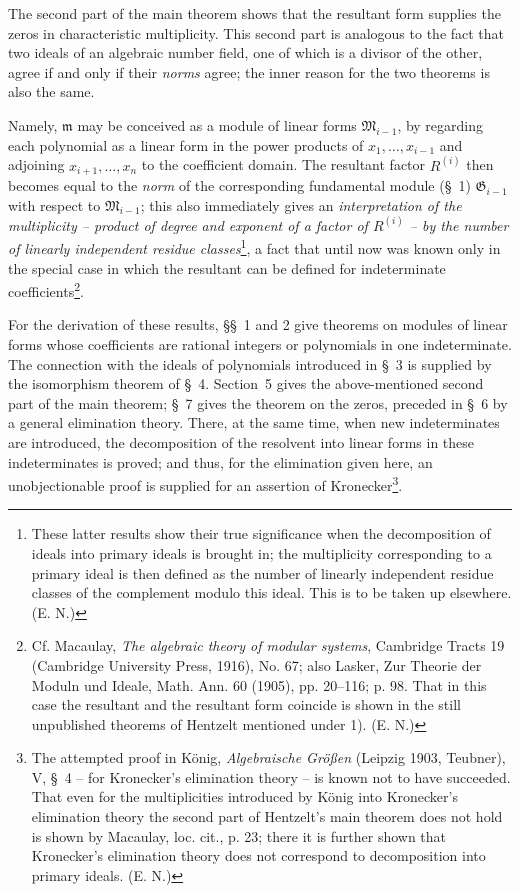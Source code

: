 \documentclass[11pt]{article}
\providecommand{\Gmod}{\mathfrak G}
\providecommand{\mideal}{\mathfrak m}
\providecommand{\Gmod}{\mathfrak G}
\providecommand{\mideal}{\mathfrak m}
\begin{document}
The second part of the main theorem shows that the resultant form supplies the zeros in characteristic multiplicity. This second part is analogous to the fact that two ideals of an algebraic number field, one of which is a divisor of the other, agree if and only if their \emph{norms} agree; the inner reason for the two theorems is also the same.

Namely, $\mideal$ may be conceived as a module of linear forms $\mathfrak M_{i-1}$, by regarding each polynomial as a linear form in the power products of $x_1,\ldots,x_{i-1}$ and adjoining $x_{i+1},\ldots,x_n$ to the coefficient domain. The resultant factor $R^{(i)}$ then becomes equal to the \emph{norm} of the corresponding fundamental module (§~1) $\Gmod_{i-1}$ with respect to $\mathfrak M_{i-1}$; this also immediately gives an \emph{interpretation of the multiplicity -- product of degree and exponent of a factor of $R^{(i)}$ -- by the number of linearly independent residue classes}\footnote{These latter results show their true significance when the decomposition of ideals into primary ideals is brought in; the multiplicity corresponding to a primary ideal is then defined as the number of linearly independent residue classes of the complement modulo this ideal. This is to be taken up elsewhere. (E. N.)}, a fact that until now was known only in the special case in which the resultant can be defined for indeterminate coefficients\footnote{Cf. Macaulay, \emph{The algebraic theory of modular systems}, Cambridge Tracts 19 (Cambridge University Press, 1916), No. 67; also Lasker, Zur Theorie der Moduln und Ideale, Math. Ann. 60 (1905), pp. 20--116; p. 98. That in this case the resultant and the resultant form coincide is shown in the still unpublished theorems of Hentzelt mentioned under 1). (E. N.)}.

For the derivation of these results, §§~1 and 2 give theorems on modules of linear forms whose coefficients are rational integers or polynomials in one indeterminate. The connection with the ideals of polynomials introduced in §~3 is supplied by the isomorphism theorem of §~4. Section~5 gives the above-mentioned second part of the main theorem; §~7 gives the theorem on the zeros, preceded in §~6 by a general elimination theory. There, at the same time, when new indeterminates are introduced, the decomposition of the resolvent into linear forms in these indeterminates is proved; and thus, for the elimination given here, an unobjectionable proof is supplied for an assertion of Kronecker\footnote{The attempted proof in König, \emph{Algebraische Größen} (Leipzig 1903, Teubner), V, §~4 -- for Kronecker's elimination theory -- is known not to have succeeded. That even for the multiplicities introduced by König into Kronecker's elimination theory the second part of Hentzelt's main theorem does not hold is shown by Macaulay, loc. cit., p. 23; there it is further shown that Kronecker's elimination theory does not correspond to decomposition into primary ideals. (E. N.)}.
\end{document}
